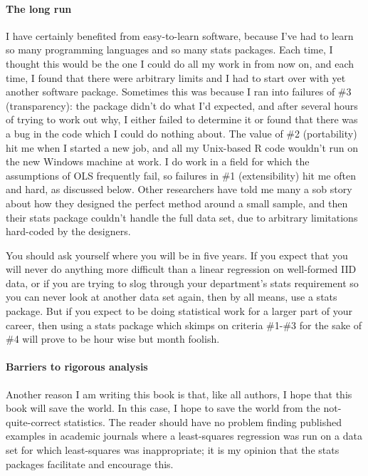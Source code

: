 \paragraph{The long run}
I have certainly benefited from easy-to-learn software, because I've had to learn
so many programming languages and so many stats packages. Each time, I thought
this would be the one I could do all my work in from now on, and each time, I
found that there were arbitrary limits and I had to start over with yet another software package.
Sometimes this was because I ran into failures of \#3 (transparency): the package
didn't do what I'd expected, and after several hours of trying to work
out why, I either failed to determine it or found that there was a bug
in the code which I could do nothing about. The value of \#2 (portability) hit me
when I started a new job, and all my Unix-based R code wouldn't run
on the new Windows machine at work. I do work in a field for which the
assumptions of OLS frequently fail, so failures in \#1 (extensibility) hit me often and hard,
as discussed below. Other researchers have told me many a sob story
about how they designed the perfect method around a small sample, and
then their stats package couldn't handle the full data set, due to
arbitrary limitations hard-coded by the designers.

You should ask yourself where you will be in five years. If you expect that you will never do
anything more difficult than a linear regression on well-formed IID data, or if you are trying to slog
through your department's stats requirement so you can never look at another data set again, then by all means, use a
stats package. But if you expect to be doing statistical work for a larger part of your career, then using a
stats package which skimps on criteria \#1-\#3 for the sake of \#4 will prove to be
hour wise but month foolish. 

\paragraph{Barriers to rigorous analysis}
Another reason I am writing this book is that, like all authors, I hope
that this book will save the world. In this case, I hope to save the
world from the not-quite-correct statistics.  The reader should have
no problem finding published examples in academic journals where a
least-squares regression was run on a data set for which least-squares
was inappropriate; it is my opinion that the stats packages facilitate
and encourage this.

